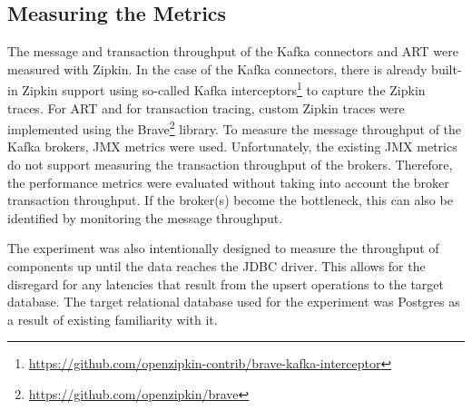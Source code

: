 \subsection{Measuring the Metrics}
The message and transaction throughput of the Kafka connectors and \ac{ART} were measured with Zipkin. In the case of the Kafka connectors, there is already built-in Zipkin support using so-called Kafka interceptors\footnote{\url{https://github.com/openzipkin-contrib/brave-kafka-interceptor}} to capture the Zipkin traces. For \ac{ART} and for transaction tracing, custom Zipkin traces were implemented using the Brave\footnote{\url{https://github.com/openzipkin/brave}} library. To measure the message throughput of the Kafka brokers, \ac{JMX} metrics were used. Unfortunately, the existing \ac{JMX} metrics do not support measuring the transaction throughput of the brokers. Therefore, the performance metrics were evaluated without taking into account the broker transaction throughput. If the broker(s) become the bottleneck, this can also be identified by monitoring the message throughput.


The experiment was also intentionally designed to measure the throughput of components up until the data reaches the \ac{JDBC} driver. This allows for the disregard for any latencies that result from the upsert operations to the target database. The target relational database used for the experiment was Postgres as a result of existing familiarity with it.

